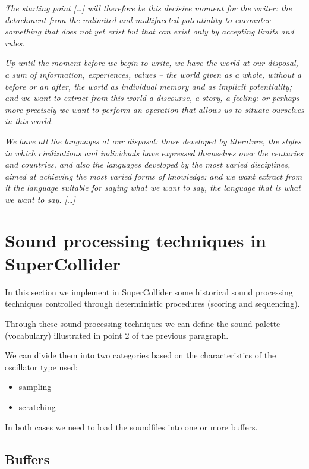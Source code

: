 \textit{The starting point {[}\ldots{]} will therefore be this decisive moment for the writer: the detachment from the unlimited and multifaceted potentiality to encounter something that does not yet exist but that can exist only by accepting limits and rules.}

\textit{Up until the moment before we begin to write, we have the world at our disposal, a sum of information, experiences, values -- the world given as a whole, without a before or an after, the world as individual memory and as implicit potentiality; and we want to extract from this world a discourse, a story, a feeling: or perhaps more precisely we want to
perform an operation that allows us to situate ourselves in this world.}

\textit{We have all the languages at our disposal: those developed by literature, the styles in which civilizations and individuals have expressed themselves over the centuries and countries, and also the languages developed by the most varied disciplines, aimed at achieving the most varied forms of knowledge: and we want extract from it the
language suitable for saying what we want to say, the language that is what we want to say. {[}\ldots{]} }   

\section{Sound processing techniques in SuperCollider}\label{sound-processing-techniques-in-supercollider}

In this section we implement in SuperCollider some historical sound processing techniques controlled through deterministic procedures (scoring and sequencing).

Through these sound processing techniques we can define the sound palette (vocabulary) illustrated in point 2 of the previous paragraph.

We can divide them into two categories based on the characteristics of the oscillator type used:

\begin{itemize}
\tightlist
\item sampling 
\item scratching
\end{itemize}

In both cases we need to load the soundfiles into one or more buffers.

\subsection{Buffers}\label{buffers}

